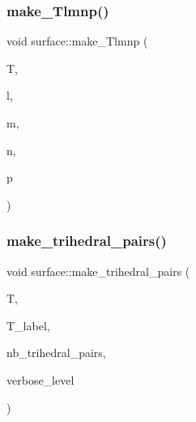 \subsubsection{\texorpdfstring{make\+\_\+\+Tlmnp()}{make\_Tlmnp()}}
{\footnotesize\ttfamily void surface\+::make\+\_\+\+Tlmnp (\begin{DoxyParamCaption}\item[{\mbox{\hyperlink{galois_8h_a09fddde158a3a20bd2dcadb609de11dc}{I\+NT}} $\ast$}]{T,  }\item[{\mbox{\hyperlink{galois_8h_a09fddde158a3a20bd2dcadb609de11dc}{I\+NT}}}]{l,  }\item[{\mbox{\hyperlink{galois_8h_a09fddde158a3a20bd2dcadb609de11dc}{I\+NT}}}]{m,  }\item[{\mbox{\hyperlink{galois_8h_a09fddde158a3a20bd2dcadb609de11dc}{I\+NT}}}]{n,  }\item[{\mbox{\hyperlink{galois_8h_a09fddde158a3a20bd2dcadb609de11dc}{I\+NT}}}]{p }\end{DoxyParamCaption})}

\mbox{\label{classsurface_ad5643c9ea75032122ba52e24d1fc23c4}} 
\subsubsection{\texorpdfstring{make\+\_\+trihedral\+\_\+pairs()}{make\_trihedral\_pairs()}}
{\footnotesize\ttfamily void surface\+::make\+\_\+trihedral\+\_\+pairs (\begin{DoxyParamCaption}\item[{\mbox{\hyperlink{galois_8h_a09fddde158a3a20bd2dcadb609de11dc}{I\+NT}} $\ast$\&}]{T,  }\item[{\mbox{\hyperlink{galois_8h_ab6cc7b4aeb6ea31aba2b3fbfc83ff5e6}{B\+Y\+TE}} $\ast$$\ast$\&}]{T\+\_\+label,  }\item[{\mbox{\hyperlink{galois_8h_a09fddde158a3a20bd2dcadb609de11dc}{I\+NT}} \&}]{nb\+\_\+trihedral\+\_\+pairs,  }\item[{\mbox{\hyperlink{galois_8h_a09fddde158a3a20bd2dcadb609de11dc}{I\+NT}}}]{verbose\+\_\+level }\end{DoxyParamCaption})}

\mbox{\label{classsurface_a92bcacad9efa59d8a6afc68d5b3312f9}} 
